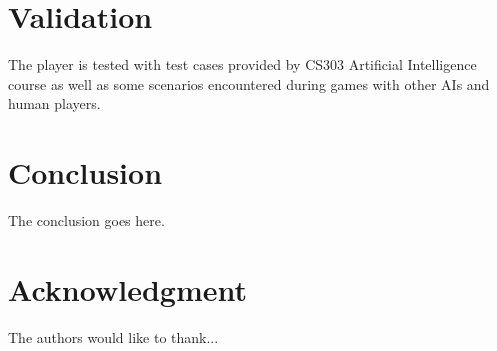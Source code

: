 \documentclass[conference]{IEEEtran}
\begin{document}
\section{Validation}
	The player is tested with test cases provided by CS303 Artificial Intelligence course as well as some scenarios encountered during games with other AIs and human players. 

  \section{Conclusion}
  The conclusion goes here.

  \section*{Acknowledgment}

  The authors would like to thank...
  
  
  
  
  
  
\end{document}
